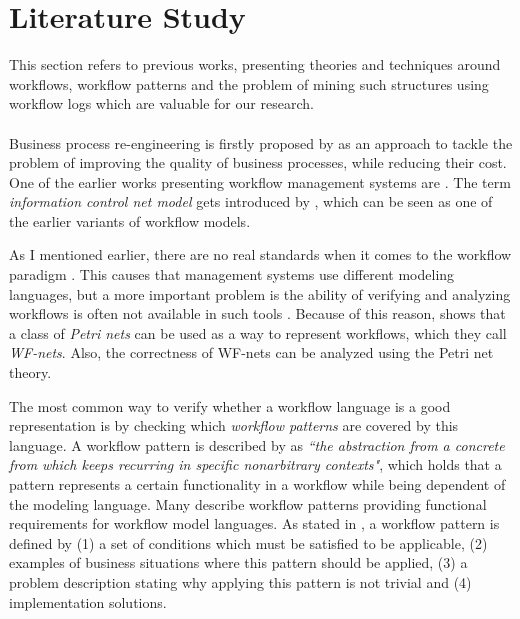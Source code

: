 \documentclass[a4paper,11pt]{article}
\begin{document}

\section{Literature Study}
This section refers to previous works, presenting theories and techniques around workflows, workflow patterns and the problem of mining such structures using workflow logs which are valuable for our research.\\
\\
Business process re-engineering is firstly proposed by \cite{Hammer1990} as an approach to tackle the problem of improving the quality of business processes, while reducing their cost. One of the earlier works presenting workflow management systems are \cite{EngelGLT79,Ellis1982}. The term \textit{information control net model} gets introduced by \cite{Ellis1982}, which can be seen as one of the earlier variants of workflow models. 

As I mentioned earlier, there are no real standards when it comes to the workflow paradigm \cite{VanderAalst1997}. This causes that management systems use different modeling languages, but a more important problem is the ability of verifying and analyzing workflows is often not available in such tools \cite{VanderAalst1997}. Because of this reason, \cite{VanderAalst1997} shows that a class of \textit{Petri nets} can be used as a way to represent workflows, which they call \textit{WF-nets}. Also, the correctness of WF-nets can be analyzed using the Petri net theory. 


The most common way to verify whether a workflow language is a good representation is by checking which \textit{workflow patterns} are covered by this language. A workflow pattern is described by \cite{Riehle1996} as \textit{``the abstraction from a concrete from which keeps recurring in specific nonarbitrary contexts"}, which holds that a pattern represents a certain functionality in a workflow while being dependent of the modeling language. Many \cite{VanderAalst2003Patterns,Dijkstra2003ControlPatterns,Russell2004DataPatterns,Russell2005ResourcePatterns,Russell2006ExceptionPatterns} describe workflow patterns providing functional requirements for workflow model languages. As stated in \cite{VanderAalst2003Patterns,Dijkstra2003ControlPatterns,Russell2004DataPatterns,Russell2005ResourcePatterns,Russell2006ExceptionPatterns}, a workflow pattern is defined by (1) a set of conditions which must be satisfied to be applicable, (2) examples of business situations where this pattern should be applied, (3) a problem description stating why applying this pattern is not trivial and (4) implementation solutions.
\end{document}
